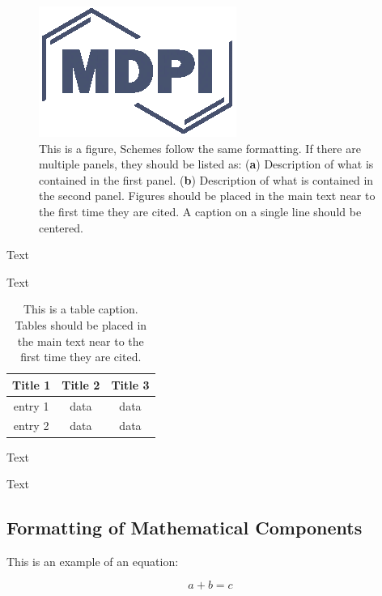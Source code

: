 \documentclass[applsci,article,submit,moreauthors,pdftex]{Definitions/mdpi}
\begin{document}
\begin{figure}[H]
\centering
\includegraphics[width=2 cm]{Definitions/logo-mdpi}
\caption{This is a figure, Schemes follow the same formatting. If there are multiple panels, they should be listed as: (\textbf{a}) Description of what is contained in the first panel. (\textbf{b}) Description of what is contained in the second panel. Figures should be placed in the main text near to the first time they are cited. A caption on a single line should be centered.}
\end{figure}   
 
Text

Text

\begin{table}[H]
\caption{This is a table caption. Tables should be placed in the main text near to the first time they are cited.}
\centering
\begin{tabular}{ccc}
\toprule
\textbf{Title 1}	& \textbf{Title 2}	& \textbf{Title 3}\\
\midrule
entry 1		& data			& data\\
entry 2		& data			& data\\
\bottomrule
\end{tabular}
\end{table}

Text

Text



\subsection{Formatting of Mathematical Components}

This is an example of an equation:

\begin{equation}
a + b = c
\end{equation}
\end{document}
